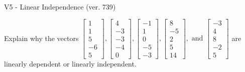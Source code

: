 \begin{exercise}
  \begin{exerciseTitle}V5 - Linear Independence (ver. 739)\end{exerciseTitle}
  \begin{exerciseStatement}
    Explain why the vectors \(\left[\begin{array}{r}
1 \\
1 \\
5 \\
-6 \\
5
\end{array}\right] , \left[\begin{array}{r}
4 \\
-3 \\
-3 \\
-4 \\
0
\end{array}\right] , \left[\begin{array}{r}
-1 \\
1 \\
0 \\
-5 \\
-3
\end{array}\right] , \left[\begin{array}{r}
8 \\
-5 \\
2 \\
5 \\
14
\end{array}\right] , \text{ and } \left[\begin{array}{r}
-3 \\
4 \\
8 \\
-2 \\
5
\end{array}\right]\) are linearly dependent or linearly independent.	



\end{exerciseStatement}
\end{exercise}
